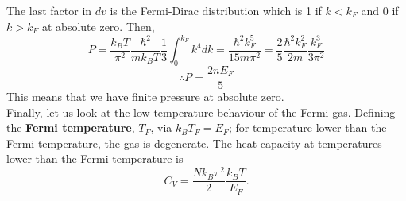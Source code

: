         The last factor in $dv$ is the Fermi-Dirac distribution which is 1 if $k<k_F$ and 0 if $k>k_F$ at absolute zero. Then,
        \begin{equation}
            P = \frac{k_BT}{\pi^2}\frac{\hbar^2}{mk_BT}\frac{1}{3}\int_{0}^{k_F}k^4dk = \frac{\hbar^2k_F^5}{15m\pi^2}=\frac{2}{5}\frac{\hbar^2k_F^2}{2m}\frac{k_F^3}{3\pi^2}
        \end{equation}
        \begin{equation}
            \therefore P = \frac{2nE_F}{5}
        \end{equation}
        This means that we have finite pressure at absolute zero. \\
        Finally, let us look at the low temperature behaviour of the Fermi gas. Defining the \textbf{Fermi temperature}, $T_F$, via $k_BT_F=E_F$; for temperature lower than the Fermi temperature, the gas is degenerate. The heat capacity at temperatures lower than the Fermi temperature is
        \begin{equation}
            C_V = \frac{Nk_B\pi^2}{2}\frac{k_BT}{E_F}.
        \end{equation}
        
